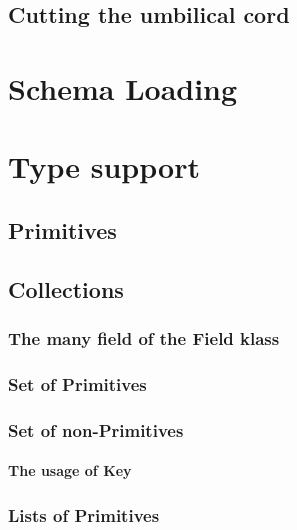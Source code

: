 \subsection{Cutting the umbilical cord}\label{subsec:Cutting the umbilical cord}

\section{Schema Loading}\label{sec:Schema Loading}

\section{Type support}\label{sec:Implementation Types}

\subsection{Primitives}\label{subsec:Types Primitives}

\subsection{Collections}\label{subsec:Types Collections}

\subsubsection{The many field of the Field klass}

\subsubsection{Set of Primitives}
\subsubsection{Set of non-Primitives}
\paragraph{The usage of Key}\label{The usage of Key}
\subsubsection{Lists of Primitives}
